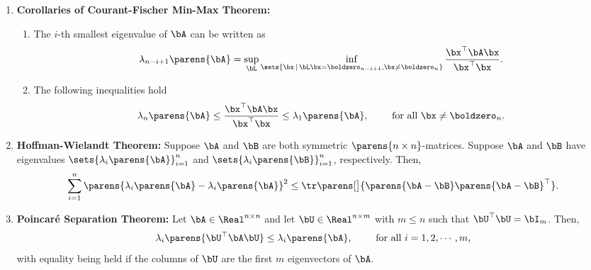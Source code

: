 \documentclass[12pt]{article}
\begin{document}
\begin{enumerate}[label=\textbf{\arabic*.}]
	\item \textbf{Corollaries of Courant-Fischer Min-Max Theorem:} 
	\begin{enumerate}
		\item The $i$-th smallest eigenvalue of $\bA$ can be written as 
		\begin{align*}
			\lambda_{n-i+1} \parens{\bA} = \sup_{\bL} \inf_{\sets{\bx \,\vert\, \bL \bx = \boldzero_{n-i+1}, \bx \neq \boldzero_n}} \frac{\bx^\top \bA \bx}{\bx^\top \bx}. 
		\end{align*}
		\item The following inequalities hold 
		\begin{align*}
			\lambda_{n} \parens{\bA} \le \frac{\bx^\top \bA \bx}{\bx^\top \bx} \le \lambda_1 \parens{\bA}, \qquad \text{ for all } \bx \neq \boldzero_{n}. 
		\end{align*}
	\end{enumerate}
	
	\item \textbf{Hoffman-Wielandt Theorem:} Suppose $\bA$ and $\bB$ are both symmetric $\parens{n \times n}$-matrices. Suppose $\bA$ and $\bB$ have eigenvalues $\sets{\lambda_i \parens{\bA}}_{i=1}^n$ and $\sets{\lambda_i \parens{\bB}}_{i=1}^n$, respectively. Then, 
	\begin{align}
		\sum_{i=1}^n \parens{\lambda_i \parens{\bA} - \lambda_i \parens{\bA}}^2 \le \tr \parens[\big]{\parens{\bA - \bB} \parens{\bA - \bB}^\top}. 
	\end{align}
	
	
	\item \textbf{Poincar{\'e} Separation Theorem:} Let $\bA \in \Real^{n \times n}$ and let $\bU \in \Real^{n \times m}$ with $m \le n$  such that $\bU^\top \bU = \bI_m$. Then, 
	\begin{align}
		\lambda_i \parens{\bU^\top \bA \bU} \le \lambda_i \parens{\bA}, \qquad \text{ for all } i = 1, 2, \cdots, m, 
	\end{align}
	with equality being held if the columns of $\bU$ are the first $m$ eigenvectors of $\bA$. 
	

\end{enumerate}
\end{document}
